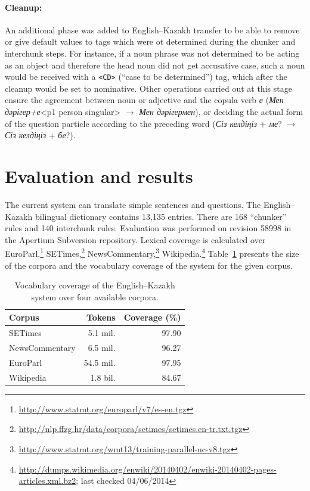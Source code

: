 \documentclass[11pt]{article}
\begin{document}
\paragraph{Cleanup:} An additional phase was added to  English--Kazakh transfer to be able to remove or give default values to tags which were ot determined during the chunker and 
interchunk steps. For instance, if a noun phrase was not determined to be acting as an object and therefore the head noun did not get accusative case, such a noun would be received with a  \texttt{<CD>} (``case to be determined'') tag, which after the cleanup would be set to nominative. Other operations carried out at this stage ensure
the agreement between noun or adjective and the copula verb \emph{е} (\emph{Мен дәрігер+е}<p1 person singular> \(\to\) \emph{Мен дәрігермен}), or deciding the actual form of the question particle according to the preceding word (\emph{Сіз келдіңіз} + \emph{ме}? \(\to\) \emph{Сіз келдіңіз} + \emph{бе}?).

\section{Evaluation and results}

The current system can translate simple sentences and questions. The English--Kazakh bilingual dictionary 
contains 13,135 entries. There are 168 ``chunker'' rules and 140 interchunk rules. 
Evaluation was performed on revision 58998 in the Apertium Subversion repository. Lexical coverage is calculated 
over EuroParl,\footnote{\url{http://www.statmt.org/europarl/v7/es-en.tgz}} SETimes,\footnote{\url{http://nlp.ffzg.hr/data/corpora/setimes/setimes.en-tr.txt.tgz}} NewsCommentary,\footnote{\url{http://www.statmt.org/wmt13/training-parallel-nc-v8.tgz}} Wikipedia.\footnote{\url{http://dumps.wikimedia.org/enwiki/20140402/enwiki-20140402-pages-articles.xml.bz2}; last checked 04/06/2014} 
Table~\ref{table:coverage} presents the size of the corpora and the vocabulary coverage of the system for the given corpus.

\begin{table}
  \centering
  \begin{tabular}{|l|r|r|}
    \hline
    \textbf{Corpus} & \textbf{Tokens} & \textbf{Coverage} (\%) \\
    \hline
    SETimes & 5.1 mil. & 97.90 \\
    NewsCommentary & 6.5 mil. & 96.27 \\
    EuroParl & 54.5 mil. & 97.95 \\
    Wikipedia & 1.8 bil. & 84.67 \\
    \hline
  \end{tabular}
  \caption{Vocabulary coverage of the English--Kazakh system over four available corpora.}
  \label{table:coverage}
\end{table}
\end{document}

